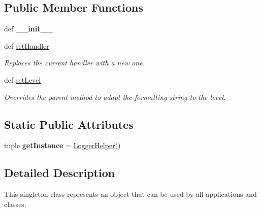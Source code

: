 \subsection*{Public Member Functions}
\begin{DoxyCompactItemize}
\item 
\hypertarget{classmedpy_1_1core_1_1Logger_1_1Logger_a8fdfdb7972f6ca4f3b20e98985988bc7}{
def {\bfseries \_\-\_\-init\_\-\_\-}}
\label{classmedpy_1_1core_1_1Logger_1_1Logger_a8fdfdb7972f6ca4f3b20e98985988bc7}

\item 
def \hyperlink{classmedpy_1_1core_1_1Logger_1_1Logger_a9b4ca5d9e5d84d5da1ebda4929c3d757}{setHandler}
\begin{DoxyCompactList}\small\item\em Replaces the current handler with a new one. \end{DoxyCompactList}\item 
\hypertarget{classmedpy_1_1core_1_1Logger_1_1Logger_a7ef3cbfa57e61d02882e586ff7baa176}{
def \hyperlink{classmedpy_1_1core_1_1Logger_1_1Logger_a7ef3cbfa57e61d02882e586ff7baa176}{setLevel}}
\label{classmedpy_1_1core_1_1Logger_1_1Logger_a7ef3cbfa57e61d02882e586ff7baa176}

\begin{DoxyCompactList}\small\item\em Overrides the parent method to adapt the formatting string to the level. \end{DoxyCompactList}\end{DoxyCompactItemize}
\subsection*{Static Public Attributes}
\begin{DoxyCompactItemize}
\item 
\hypertarget{classmedpy_1_1core_1_1Logger_1_1Logger_ae169695a25c1a25f4929d03eb5ff016b}{
tuple {\bfseries getInstance} = \hyperlink{classmedpy_1_1core_1_1Logger_1_1Logger_1_1LoggerHelper}{LoggerHelper}()}
\label{classmedpy_1_1core_1_1Logger_1_1Logger_ae169695a25c1a25f4929d03eb5ff016b}

\end{DoxyCompactItemize}


\subsection{Detailed Description}
This singleton class represents an object that can be used by all applications and classes. 

